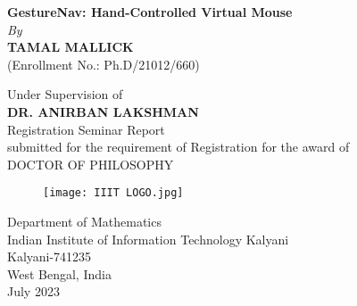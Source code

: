 
\thispagestyle{empty}
\begin{center}
 {\bf{\large{GestureNav: Hand-Controlled Virtual Mouse}}}\\
 \vspace{.1cm}
 \large{ \it{By}}\\
 \vspace{.1cm}
 {\bf{\large{TAMAL MALLICK}}}\\
\large{(Enrollment No.: Ph.D/21012/660)}
\end{center}

\begin{center}
\large{Under Supervision of}\\
{\bf{\large{DR. ANIRBAN LAKSHMAN}}}\\
\Large{Registration Seminar Report}\\
submitted for the requirement of Registration for the award of\\
DOCTOR OF PHILOSOPHY\\
\vspace{.5cm}
\begin{figure}[h]
\begin{center}
\texttt{[image: IIIT LOGO.jpg]}
\end{center}
\end{figure}
\large{Department of Mathematics\\
Indian Institute of Information Technology Kalyani\\
Kalyani-741235\\
West Bengal, India\\
July 2023}
\end{center}

\cleardoublepage
%